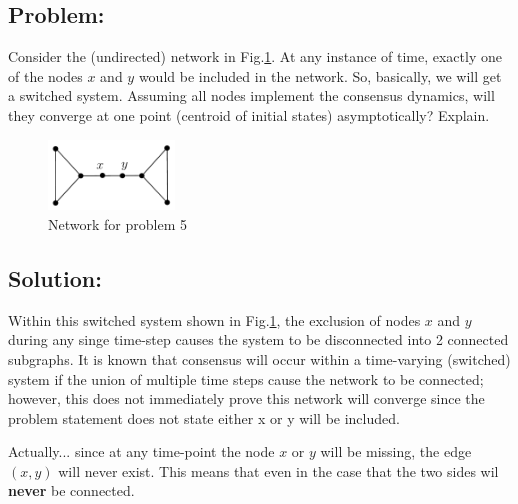 \documentclass[]{article}
\numberwithin{equation}{section}
\renewcommand{\figurename}{Fig.}
\begin{document}
\subsection*{Problem:}
Consider the (undirected) network in \figurename \ref{fig:pblm5}. 
At any instance of time, exactly one of the nodes $x$ and $y$ would be included in the network. 
So, basically, we will get a switched system. 
Assuming all nodes implement the consensus dynamics, will they converge at one point (centroid of initial states) asymptotically?
Explain.
\begin{figure}[h]
    \centering
    \includegraphics[width=0.3\textwidth]{figs/pblm5.png}
    \caption{Network for problem 5}
    \label{fig:pblm5}
\end{figure}

% 
% 


\subsection*{Solution:}
Within this switched system shown in \figurename \ref{fig:pblm5}, the exclusion of nodes $x$ and $y$ during any singe time-step causes the system to be disconnected into 2 connected subgraphs. 
It is known that consensus will occur within a time-varying (switched) system if the union of multiple time steps cause the network to be connected; 
however, this does not immediately prove this network will converge since the problem statement does not state either x or y will be included.

{\color{red}
    Actually... since at any time-point the node $x$ or $y$ will be missing, the edge $(x,y)$ will never exist.
    This means that even in the case that the two sides wil \textbf{never} be connected.
}


\newpage
\section{}
\end{document}
